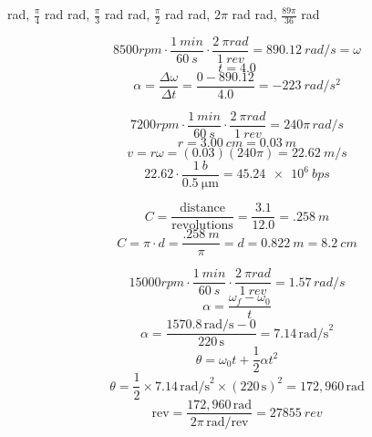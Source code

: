 \documentclass[11pt]{homework}
\begin{document}
\maketitle

\renewcommand{\questiontype}{Problem}
\setcounter{questionCounter}{0}

\question
\begin{alphaparts}
 rad, $\frac{\pi}{4}$ rad
 rad, $\frac{\pi}{3}$ rad
 rad, $\frac{\pi}{2}$ rad
 rad, $2\pi$ rad
 rad, $\frac{89\pi}{36}$ rad
\end{alphaparts}


\setcounter{questionCounter}{3}
\question
\[
    8500 \unit{rpm} \cdot \frac{\qty{1}{min}}{\qty{60}{s}} \cdot \frac{\qty{2}{\pi rad}}{\qty{1}{rev}} = \qty{890.12}{rad /s} = \omega
\]
\[
t = 4.0
\]
\[
    \alpha = \frac{\Delta\omega}{\Delta t}=\frac{0-890.12}{4.0} = \boxed{\qty{-223}{rad /s^2}}
\]

\question
\begin{alphaparts}
\questionpart
\[
    7200 \unit{rpm} \cdot \frac{\qty{1}{min}}{\qty{60}{s}} \cdot \frac{\qty{2}{\pi rad}}{\qty{1}{rev}} = \boxed{240\pi\, \unit{rad /s}}
\]
\questionpart
\[
r = \qty{3.00}{cm} = \qty{0.03}{m}
\]
\[
    v= r \omega = (0.03)(240\pi) = \boxed{\qty{22.62}{m /s}}
\]
\questionpart
\[
    22.62 \cdot \frac{\qty{1}{b}}{\qty{0.5}{\micro\meter}}= \boxed{\qty{45.24e6}{bps}}
\]



\end{alphaparts}


\question
\[
    C=\frac{\text{distance}}{\text{revolutions}}=\frac{3.1}{12.0}=\qty{.258}{m}
\]
\[
C =\pi \cdot d = \frac{\qty{.258}{m}}{\pi}=d=\qty{0.822}{m}=\boxed{\qty{8.2}{cm}}
\]



\setcounter{questionCounter}{18}
\question
\[
    15000 \unit{rpm} \cdot \frac{\qty{1}{min}}{\qty{60}{s}} \cdot \frac{\qty{2}{\pi rad}}{\qty{1}{rev}} = 1.57\, \unit{rad /s}
\]
\[
\alpha = \frac{\omega_f - \omega_0}{t}
\]
\[
\alpha = \frac{1570.8 \, \text{rad/s} - 0}{220 \, \text{s}} = 7.14 \, \text{rad/s}^2
\]
\[
\theta = \omega_0 t + \frac{1}{2} \alpha t^2
\]
\[
\theta = \frac{1}{2} \times 7.14 \, \text{rad/s}^2 \times (220 \, \text{s})^2= 172,960 \, \text{rad}
\]
\[
\text{rev} = \frac{172,960 \, \text{rad}}{2\pi \, \text{rad/rev}} = \boxed{\qty{27855}{rev}}
\]
\end{document}
